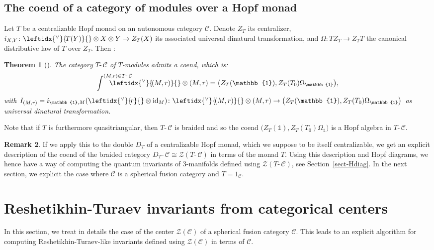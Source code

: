 \documentclass[a4paper]{amsart}
\newtheorem{thm}{Theorem}[section]
\theoremstyle{definition}
\newtheorem{rem}[thm]{Remark}
\newcommand{\co}{\colon}
\newcommand{\id}{\mathrm{id}}
\newcommand{\cc}{\mathcal{C}}
\newcommand{\zz}{\mathcal{Z}}
\newcommand{\ti}{\mbox{-}\,}
\newcommand{\un}{\mathbb{1}}
\newcommand{\ldual}[1]{\leftidx{^\vee}{\!#1}{}}
\begin{document}
\subsection{The coend of a category of modules over a Hopf monad}
Let $T$ be a centralizable Hopf monad on an autonomous category $\cc$. Denote $Z_T$ its centralizer, $i_{X,Y} \co
\ldual{T(Y)} \otimes X \otimes Y \to Z_T(X)$ its associated universal dinatural transformation, and $\Omega\co TZ_T \to
Z_TT$ the canonical distributive law of $T$ over $Z_T$. Then :
\begin{thm}[\cite{BV3}]\label{thm-coend}
The category $T\ti\cc$ of $T$-modules admits a coend, which is:
\begin{equation*}
\int^{(M,r) \in T\ti\cc}\!\!\!\!\!\!\!\!\!\!\!\!\!\!\!\!\!\!\!\!\! \ldual{(M,r)} \otimes
(M,r)=\bigl(Z_T(\un),Z_T(T_0)\Omega_\un\bigr),
\end{equation*}
with $I_{(M,r)}=i_{\un,M}(\ldual{r} \otimes \id_M)\co \ldual{(M,r)} \otimes (M,r) \to
\bigl(Z_T(\un),Z_T(T_0)\Omega_\un\bigr)$ as universal dinatural transformation.
\end{thm}

Note that if $T$ is furthermore quasitriangular, then $T\ti\cc$ is braided and so the coend
$\bigl(Z_T(\un),Z_T(T_0)\Omega_\un\bigr)$ is a Hopf algebra in $T\ti\cc$.

\begin{rem}
If we apply this to the double $D_T$ of a centralizable Hopf monad, which we suppose to be itself centralizable, we get an
explicit description of the coend of the braided category $D_T \ti \cc \cong \zz(T\ti\cc)$ in terms of the monad $T$. Using
this description and Hopf diagrams, we hence have a way of computing the quantum invariants of 3-manifolds defined using
$\zz(T\ti\cc)$, see Section~\ref{sect-Hdiag}. In the next section, we explicit the case where $\cc$ is a spherical fusion
category and $T=1_\cc$.
\end{rem}

\section{Reshetikhin-Turaev invariants from categorical centers}\label{sect-RT}

In this section, we treat in details the case of the center $\zz(\cc)$ of a spherical fusion category $\cc$. This leads to
an explicit algorithm for computing Reshetikhin-Turaev-like invariants defined using $\zz(\cc)$ in terms of $\cc$.
\end{document}
